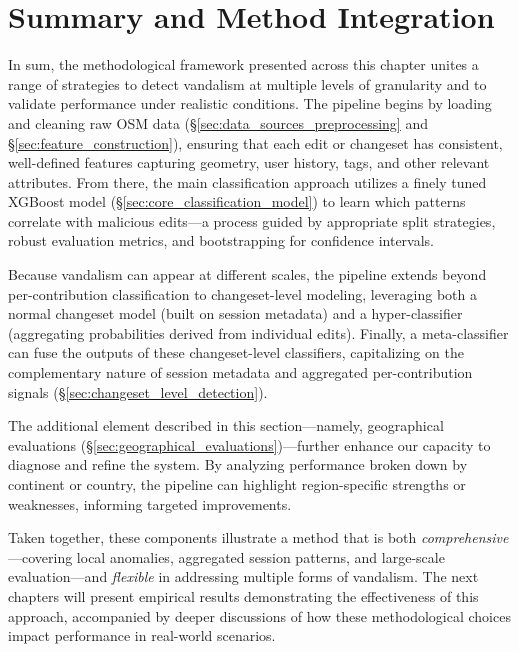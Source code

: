 \documentclass[
    13pt, %
    a4paper, %
    DIV14, %
    listof=totoc, %
    bibliography=totoc, %
    index=totoc, %
    headsepline
]{scrreprt}
\begin{document}
\section{Summary and Method Integration}
\label{sec:method_summary_integration}

In sum, the methodological framework presented across this chapter unites a range of strategies to detect vandalism at multiple levels of granularity and to validate performance under realistic conditions. The pipeline begins by loading and cleaning raw OSM data (\S\ref{sec:data_sources_preprocessing} and \S\ref{sec:feature_construction}), ensuring that each edit or changeset has consistent, well-defined features capturing geometry, user history, tags, and other relevant attributes. From there, the main classification approach utilizes a finely tuned XGBoost model (\S\ref{sec:core_classification_model}) to learn which patterns correlate with malicious edits—a process guided by appropriate split strategies, robust evaluation metrics, and bootstrapping for confidence intervals.

Because vandalism can appear at different scales, the pipeline extends beyond per-contribution classification to changeset-level modeling, leveraging both a normal changeset model (built on session metadata) and a hyper-classifier (aggregating probabilities derived from individual edits). Finally, a meta-classifier can fuse the outputs of these changeset-level classifiers, capitalizing on the complementary nature of session metadata and aggregated per-contribution signals (\S\ref{sec:changeset_level_detection}).

The additional element described in this section—namely, geographical evaluations (\S\ref{sec:geographical_evaluations})—further enhance our capacity to diagnose and refine the system. By analyzing performance broken down by continent or country, the pipeline can highlight region-specific strengths or weaknesses, informing targeted improvements.

Taken together, these components illustrate a method that is both \emph{comprehensive}—covering local anomalies, aggregated session patterns, and large-scale evaluation—and \emph{flexible} in addressing multiple forms of vandalism. The next chapters will present empirical results demonstrating the effectiveness of this approach, accompanied by deeper discussions of how these methodological choices impact performance in real-world scenarios.


\end{document}
